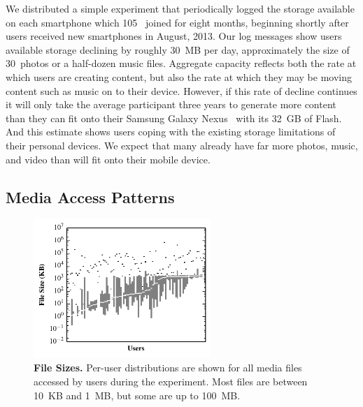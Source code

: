 We distributed a simple experiment that periodically logged the storage
available on each smartphone which 105~\PhoneLab{} joined for eight months,
beginning shortly after \PhoneLab{} users received new smartphones in August,
2013. Our log messages show users available storage declining by roughly
30~MB per day, approximately the size of 30~photos or a half-dozen music
files. Aggregate capacity reflects both the rate at which users are creating
content, but also the rate at which they may be moving content such as music
on to their device. However, if this rate of decline continues it will only
take the average \PhoneLab{} participant three years to generate more content
than they can fit onto their Samsung Galaxy Nexus~\cite{galaxynexus} with its
32~GB of Flash. And this estimate shows users coping with the existing
storage limitations of their personal devices. We expect that many already
have far more photos, music, and video than will fit onto their mobile
device.

\subsection{Media Access Patterns}

\begin{figure}

\vspace*{-0.5in}

\includegraphics[width=0.6\textwidth]{./figures/pocketlocker/FileSizeDistributionGraph.pdf}

\vspace*{-0.1in}

\caption{\small \textbf{File Sizes.} Per-user distributions are shown for all
media files accessed by \PhoneLab{} users during the experiment. Most files
are between 10~KB and 1~MB, but some are up to 100~MB.}

\label{fig-motivation-totals}

\vspace*{-0.2in}

\end{figure}

